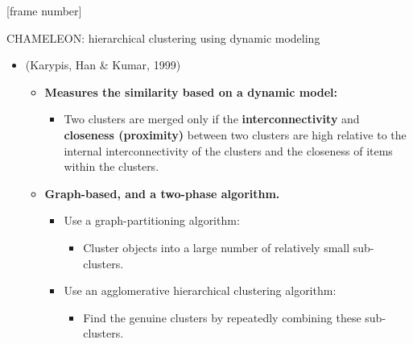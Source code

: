 \documentclass[aspectratio=169,t,xcolor=dvipsnames]{beamer}
\begin{document}
  { %
    [frame number]
    \begin{frame}{CHAMELEON: hierarchical clustering using dynamic modeling}
      \begin{itemize}
        \item (Karypis, Han \& Kumar, 1999)
        \begin{itemize}
          \item \textbf{Measures the similarity based on a dynamic model:}
          \begin{itemize}
            \item Two clusters are merged only if the \textbf{interconnectivity} and \textbf{closeness (proximity)} between two clusters are high relative to the internal interconnectivity of the clusters and the closeness of items within the clusters.
          \end{itemize}
          \item \textbf{Graph-based, and a two-phase algorithm.}
          \begin{itemize}
            \item Use a graph-partitioning algorithm:
            \begin{itemize}
              \item Cluster objects into a large number of relatively small sub-clusters.
            \end{itemize}
            \item Use an agglomerative hierarchical clustering algorithm:
            \begin{itemize}
              \item Find the genuine clusters by repeatedly combining these sub-clusters.
            \end{itemize}
          \end{itemize}
        \end{itemize}
      \end{itemize}
    \end{frame}
  }
\end{document}
